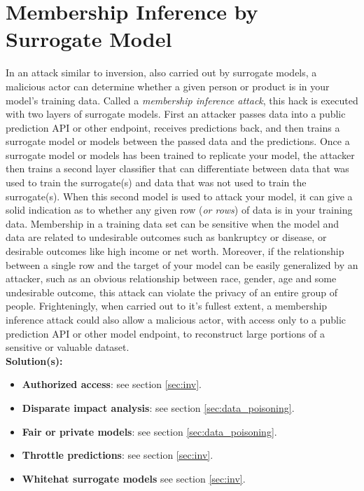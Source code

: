 \documentclass[fleqn]{article}
\begin{document}
\section{Membership Inference by Surrogate Model} \label{sec:mi}

In an attack similar to inversion, also carried out by surrogate models, a malicious actor can determine whether a given person or product is in your model's training data.  Called a \textit{membership inference attack}, this hack is executed with two layers of surrogate models. First an attacker passes data into a public prediction API or other endpoint, receives predictions back, and then trains a surrogate model or models between the passed data and the predictions. Once a surrogate model or models has been trained to replicate your model, the attacker then trains a second layer classifier that can differentiate between data that was used to train the surrogate(s) and data that was not used to train the surrogate(s). When this second model is used to attack your model, it can give a solid indication as to whether any given row (\textit{or rows}) of data is in your training data. Membership in a training data set can be sensitive when the model and data are related to undesirable outcomes such as bankruptcy or disease, or desirable outcomes like high income or net worth. Moreover, if the relationship between a single row and the target of your model can be easily generalized by an attacker, such as an obvious relationship between race, gender, age and some undesirable outcome, this attack can violate the privacy of an entire group of people. Frighteningly, when carried out to it's fullest extent, a membership inference attack could also allow a malicious actor, with access only to a public prediction API or other model endpoint, to reconstruct large portions of a sensitive or valuable dataset.\\

\noindent\textbf{Solution(s):}
\begin{itemize}
\item \textbf{Authorized access}: see section \ref{sec:inv}.
\item \textbf{Disparate impact analysis}: see section \ref{sec:data_poisoning}.
\item \textbf{Fair or private models}: see section \ref{sec:data_poisoning}.
\item \textbf{Throttle predictions}: see section \ref{sec:inv}.
\item \textbf{Whitehat surrogate models} see section \ref{sec:inv}.
\end{itemize}
\end{document}
